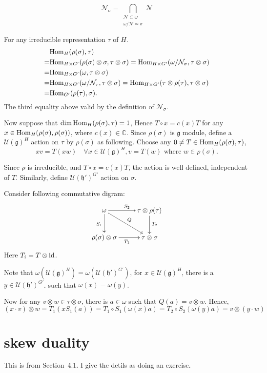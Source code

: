 \documentclass[12pt]{article}
\def\Hom{{\rm Hom}}
\def\bC{{\mathbb{C}}}
\def\id{{\rm id}}
\def\fhh{\mathfrak{h}}
\def\fgg{\mathfrak{g}}
\def\cnn{\mathcal{N}}
\def\cuu{\mathcal{U}}
\begin{document}
\[
\cnn_\sigma = \bigcap_{\substack{\cnn\subset \omega\\ \omega/\cnn\simeq \sigma}}\cnn
\]

For any irreducible representation $\tau$ of $H$.
\[
\begin{split}
&\Hom_{H}(\rho(\sigma), \tau)\\
= & \Hom_{H\times G'}(\rho(\sigma)\otimes \sigma, \tau\otimes \sigma)
=  \Hom_{H\times G'}(\omega/\cnn_\sigma, \tau\otimes \sigma)\\
= & \Hom_{H\times G'}(\omega, \tau\otimes \sigma)\\
= & \Hom_{H\times G'}(\omega/\cnn_\tau, \tau\otimes \sigma)
= \Hom_{H\times G'}(\tau\otimes \rho(\tau), \tau\otimes \sigma)\\
= & \Hom_{G'}(\rho(\tau), \sigma).
\end{split}
\]
The third equality above valid by the definition of $\cnn_\sigma$. 


Now suppose that $\dim \Hom_{H}(\rho(\sigma),\tau)=1$,
Hence $T\circ x = c(x) T$ for any $x\in \Hom_{H}(\rho(\sigma),\rho(\sigma))$, where $c(x)\in \bC$.
Since $\rho(\sigma)$ is $\fgg$ module, define a $\cuu(\fgg)^H$ action 
on $\tau$ by $\rho(\sigma)$ as following.
Choose any $0 \neq T\in \Hom_{H}(\rho(\sigma),\tau)$,
\[
x v = T(x w) \quad  \forall x\in \cuu(\fgg)^H, v=T(w) 
\text{ where } w\in \rho(\sigma).
\] 

Since $\rho$ is irreducible, and $T\circ x = c(x) T$, 
the action is well defined, independent of $T$. 
Similarly, define $\cuu(\fhh')^{G'}$ action on $\sigma$.

Consider following commutative digram:
\[
\xymatrix{
\omega \ar[r]^{S_2} \ar[d]_{S_1}\ar[dr]^{Q} & \tau\otimes \rho(\tau)\ar[d]^{T_2}\\
\rho(\sigma)\otimes \sigma\ar[r]_{T_1} & \tau\otimes \sigma 
}
\]
Here $T_i = T\otimes \id$.

Note that $\omega(\cuu(\fgg)^H) = \omega(\cuu(\fhh')^{G'})$,
for $x\in \cuu(\fgg)^H$, 
there is a $y\in \cuu(\fhh')^{G'}$.
such that $\omega(x) = \omega(y)$.


Now for any $v\otimes w\in \tau\otimes \sigma$, there is $a\in \omega$ such
that $Q(a) = v\otimes w$.
Hence, 
\[
(x \cdot v)\otimes w 
= T_1 (x S_1 (a))
= T_1 \circ S_1 (\omega(x) a)
= T_2 \circ S_2 (\omega(y) a)
= v\otimes (y\cdot w) 
\]

\section{skew duality}
This is from \cite{howe1995perspective} Section~4.1. 
I give the detils as doing an  exercise.
\end{document}

